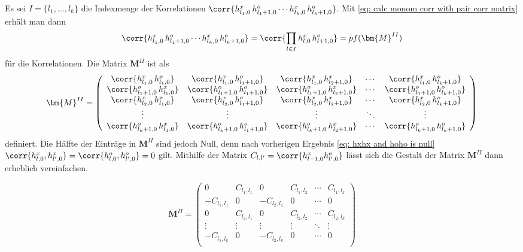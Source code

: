Es sei $I = \{l_1,\dots,l_k\}$ die Indexmenge der Korrelationen $\corr{h_{l_1,0}^x\, h_{l_1+1,0}^o \cdots h_{l_k,0}^x\, h_{l_k+1,0}^o}$.
Mit \eqref{eq: calc monom corr with pair corr matrix} erhält man dann
\begin{equation}
 \corr{h_{l_1,0}^x\, h_{l_1+1,0}^o \cdots h_{l_k,0}^x\, h_{l_k+1,0}^o} = \corr{\prod_{l \in I} h_{l,0}^x\, h_{l+1,0}^o} = pf(\bm{M}^{II} ) \\
\end{equation}
für die Korrelationen. Die Matrix $\bm{M}^{II}$ ist als
\begin{equation}
\bm{M}^{II} 
    = \left(\begin{array}{cccccc} 
      \corr{h_{l_1,0}^x\, h_{l_1,0}^x}  &  \corr{h_{l_1,0}^x\, h_{l_1+1,0}^o} & \corr{h_{l_1,0}^x\, h_{l_2+1,0}^x} & \cdots & \corr{h_{l_1,0}^x\, h_{l_k+1,0}^o} \\
      \corr{h_{l_1+1,0}^o\, h_{l_1,0}^x}  &  \corr{h_{l_1+1,0}^o\, h_{l_1+1,0}^o} & \corr{h_{l_1+1,0}^o\, h_{l_2+1,0}^x} & \cdots & \corr{h_{l_1+1,0}^o\, h_{l_k+1,0}^o} \\
      \corr{h_{l_2,0}^x\, h_{l_1,0}^x}  &  \corr{h_{l_2,0}^x\, h_{l_1+1,0}^o} & \corr{h_{l_2,0}^x\, h_{l_2+1,0}^x} & \cdots & \corr{h_{l_2,0}^x\, h_{l_k+1,0}^o} \\ 
      \vdots & \vdots & \vdots & \ddots & \vdots \\
      \corr{h_{l_k+1,0}^o\, h_{l_1,0}^x}  &  \corr{h_{l_k+1,0}^o\, h_{l_1+1,0}^o} & \corr{h_{l_k+1,0}^o\, h_{l_2+1,0}^x} & \cdots & \corr{h_{l_k+1,0}^o\, h_{l_k+1,0}^o} \\
      \end{array}\right)
\end{equation}
 definiert. Die Hälfte der Einträge in $\bm{M}^{II}$ sind jedoch Null, denn nach vorherigen Ergebnis \eqref{eq: hxhx and hoho is null} $\corr{h_{l,0}^x,h_{l',0}^x} = \corr{h_{l,0}^o,h_{l',0}^o} = 0$ gilt. Mithilfe der Matrix $C_{l,l'} = \corr{h_{l-1,0}^x h_{l',0}^o}$ lässt sich die Gestalt der Matrix $\bm{M}^{II} $ dann erheblich vereinfachen.

\begin{equation}
\bm{M}^{II} 
    = \left(\begin{array}{ccccccc} 
      0 & C_{l_1,l_1} & 0 & C_{l_1,l_2} & \cdots & C_{l_1,l_k} \\
      - C_{l_1,l_1} & 0 & -C_{l_2,l_1} & 0 & \cdots & 0 \\
      0 & C_{l_2,l_1} & 0 & C_{l_2,l_2}  & \cdots & C_{l_2,l_k} \\
      \vdots & \vdots & \vdots & \vdots  & \ddots & \vdots \\
      - C_{l_1,l_k} & 0 & -C_{l_2,l_k}  & 0 & \cdots & 0 \\
      \end{array}\right)
\end{equation}

